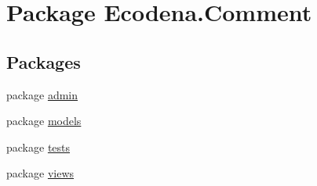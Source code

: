 \hypertarget{namespace_ecodena_1_1_comment}{
\section{Package Ecodena.Comment}
\label{d4/d8b/namespace_ecodena_1_1_comment}
}
\subsection*{Packages}
\begin{DoxyCompactItemize}
\item 
package \hyperlink{namespace_ecodena_1_1_comment_1_1admin}{admin}
\item 
package \hyperlink{namespace_ecodena_1_1_comment_1_1models}{models}
\item 
package \hyperlink{namespace_ecodena_1_1_comment_1_1tests}{tests}
\item 
package \hyperlink{namespace_ecodena_1_1_comment_1_1views}{views}
\end{DoxyCompactItemize}
